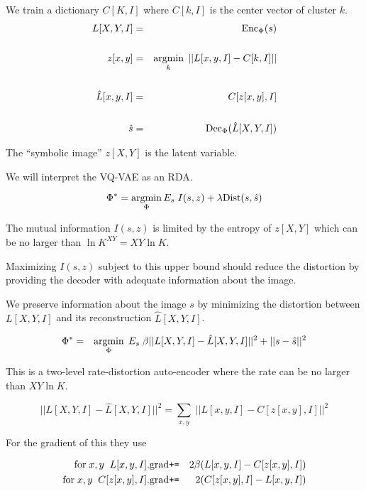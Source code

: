 {

We train a dictionary $C[K,I]$ where $C[k,I]$ is the center vector of cluster $k$.
\begin{eqnarray*}
L[X,Y,I] & = & \mathrm{Enc}_\Phi(s) \\
\\
z[x,y] & = & \operatorname*{argmin}_k \;||L[x,y,I] - C[k,I]|| \\
\\
\hat{L}[x,y,I] & = & C[z[x,y],I] \\
\\
\hat{s} & = & \mathrm{Dec}_\Phi(\hat{L}[X,Y,I])
\end{eqnarray*}

\vfill
The ``symbolic image'' $z[X,Y]$ is the latent variable.


We will interpret the VQ-VAE as an RDA.

$$\Phi^*  =  \operatorname*{argmin}_\Phi E_s\;I(s,z) + \lambda\mathrm{Dist}(s,\hat{s})$$

\vfill
The mutual information $I(s,z)$ is limited by the entropy of $z[X,Y]$ which can be no larger than $\ln K^{XY} = XY\ln K$.

\vfill
Maximizing $I(s,z)$ subject to this upper bound should reduce the distortion by providing the decoder with adequate information
about the image.


We preserve information about the image $s$ by minimizing the distortion between $L[X,Y,I]$ and its reconstruction $\hat{L}[X,Y,I]$.

\vfill
\begin{eqnarray*}
\Phi^* & = & \operatorname*{argmin}_\Phi \;E_s\; \beta||L[X,Y,I] - \hat{L}[X,Y,I]||^2 + ||s -\hat{s}||^2
\end{eqnarray*}

\vfill
This is a two-level rate-distortion auto-encoder where the rate can be no larger than $XY\ln K$.


$$||L[X,Y,I] - \hat{L}[X,Y,I]||^2 = \sum_{x,y}\;||L[x,y,I] - C[z[x,y],I]||^2$$

\vfill
For the gradient of this they use

\begin{eqnarray*}
\mathrm{for}\;x,y\;\;L[x,y,I].\mathrm{grad} & \mbox{\tt +=} & 2\beta({L}[x,y,I]- C[z[x,y],I]) \\
\mathrm{for}\;x,y\;\;C[z[x,y],I].\mathrm{grad} & \mbox{\tt +=} & 2(C[z[x,y],I] - L[x,y,I])
\end{eqnarray*}

}
